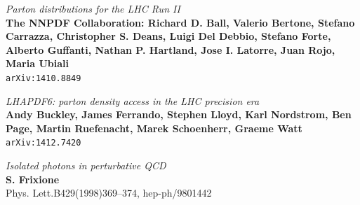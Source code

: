 \documentclass[11pt,a4paper]{report}
\begin{document}
\begin{thebibliography}{9}
	\textit{Parton distributions for the LHC Run II}\\
	\textbf{The NNPDF Collaboration: Richard D. Ball, Valerio Bertone, Stefano Carrazza, Christopher S. Deans, Luigi Del Debbio, Stefano Forte, Alberto Guffanti, Nathan P. Hartland, Jose I. Latorre, Juan Rojo, Maria Ubiali}\\
	\texttt{arXiv:1410.8849}
	
	\textit{LHAPDF6: parton density access in the LHC precision era}\\
	\textbf{Andy Buckley, James Ferrando, Stephen Lloyd, Karl Nordstrom, Ben Page, Martin Ruefenacht, Marek Schoenherr, Graeme Watt}\\
	\texttt{arXiv:1412.7420}

	\textit{Isolated photons in perturbative QCD}\\	
	\textbf{S. Frixione}\\
	Phys. Lett.B429(1998)369–374, hep-ph/9801442
%	
%	
%	
%	
	
\end{thebibliography}
\end{document}
